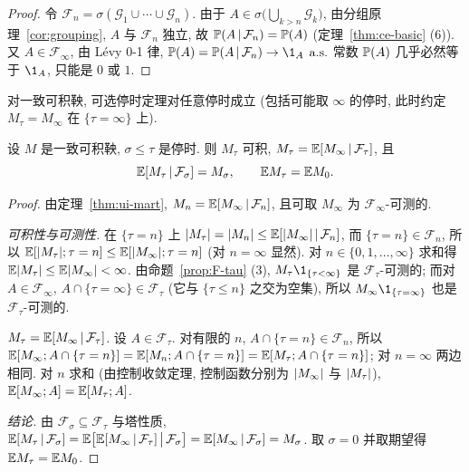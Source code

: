 \begin{proof}
令 $\mathcal{F}_n=\sigma(\mathcal{G}_1\cup\cdots\cup\mathcal{G}_n)$. 由于 $A\in\sigma\big(\bigcup_{k>n}\mathcal{G}_k\big)$, 由分组原理~\ref{cor:grouping}, $A$ 与 $\mathcal{F}_n$ 独立, 故 $\P(A\,|\,\mathcal{F}_n)=\P(A)$ (定理~\ref{thm:ce-basic} (6)). 又 $A\in\mathcal{F}_\infty$, 由 L\'evy 0-1 律, $\P(A)=\P(A\,|\,\mathcal{F}_n)\to\1_A$ $\as$ 常数 $\P(A)$ 几乎必然等于 $\1_A$, 只能是 $0$ 或 $1$.
\end{proof}

对一致可积鞅, 可选停时定理对任意停时成立 (包括可能取 $\infty$ 的停时, 此时约定 $M_\tau=M_\infty$ 在 $\{\tau=\infty\}$ 上).

\begin{theorem}\label{thm:ost-ui}
设 $M$ 是一致可积鞅, $\sigma\le\tau$ 是停时. 则 $M_\tau$ 可积, $M_\tau=\E[M_\infty\,|\,\mathcal{F}_\tau]$, 且
\[
\E[M_\tau\,|\,\mathcal{F}_\sigma]=M_\sigma,\qquad\E M_\tau=\E M_0.
\]
\end{theorem}

\begin{proof}
由定理~\ref{thm:ui-mart}, $M_n=\E[M_\infty\,|\,\mathcal{F}_n]$, 且可取 $M_\infty$ 为 $\mathcal{F}_\infty$-可测的.

\emph{可积性与可测性.} 在 $\{\tau=n\}$ 上 $\abs{M_\tau}=\abs{M_n}\le\E[\abs{M_\infty}\,|\,\mathcal{F}_n]$, 而 $\{\tau=n\}\in\mathcal{F}_n$, 所以 $\E[\abs{M_\tau};\tau=n]\le\E[\abs{M_\infty};\tau=n]$ (对 $n=\infty$ 显然). 对 $n\in\{0,1,\dots,\infty\}$ 求和得 $\E\abs{M_\tau}\le\E\abs{M_\infty}<\infty$. 由命题~\ref{prop:F-tau} (3), $M_\tau\1_{\{\tau<\infty\}}$ 是 $\mathcal{F}_\tau$-可测的; 而对 $A\in\mathcal{F}_\infty$, $A\cap\{\tau=\infty\}\in\mathcal{F}_\tau$ (它与 $\{\tau\le n\}$ 之交为空集), 所以 $M_\infty\1_{\{\tau=\infty\}}$ 也是 $\mathcal{F}_\tau$-可测的.

\emph{$M_\tau=\E[M_\infty\,|\,\mathcal{F}_\tau]$.} 设 $A\in\mathcal{F}_\tau$. 对有限的 $n$, $A\cap\{\tau=n\}\in\mathcal{F}_n$, 所以 $\E[M_\infty;A\cap\{\tau=n\}]=\E[M_n;A\cap\{\tau=n\}]=\E[M_\tau;A\cap\{\tau=n\}]$; 对 $n=\infty$ 两边相同. 对 $n$ 求和 (由控制收敛定理, 控制函数分别为 $\abs{M_\infty}$ 与 $\abs{M_\tau}$), $\E[M_\infty;A]=\E[M_\tau;A]$.

\emph{结论.} 由 $\mathcal{F}_\sigma\subseteq\mathcal{F}_\tau$ 与塔性质, $\E[M_\tau\,|\,\mathcal{F}_\sigma]=\E\big[\E[M_\infty\,|\,\mathcal{F}_\tau]\,\big|\,\mathcal{F}_\sigma\big]=\E[M_\infty\,|\,\mathcal{F}_\sigma]=M_\sigma$. 取 $\sigma=0$ 并取期望得 $\E M_\tau=\E M_0$.
\end{proof}

